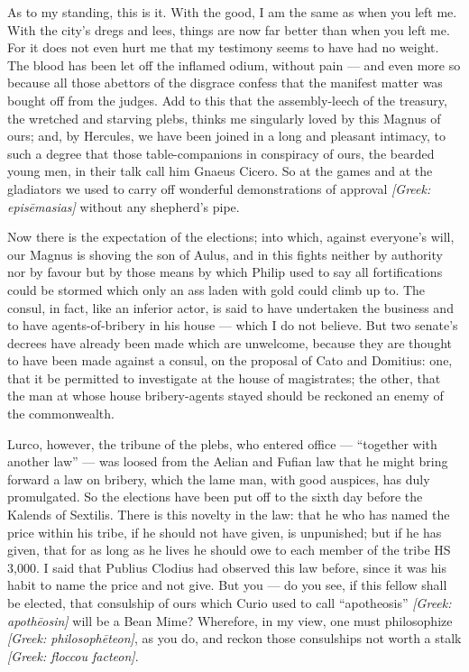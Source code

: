  As to my standing, this is it. With the good, I am the same as when you left me. With the city's dregs and lees, things are now far better than when you left me. For it does not even hurt me that my testimony seems to have had no weight. The blood has been let off the inflamed odium, without pain --- and even more so because all those abettors of the disgrace confess that the manifest matter was bought off from the judges. Add to this that the assembly-leech of the treasury, the wretched and starving plebs, thinks me singularly loved by this Magnus of ours; and, by Hercules, we have been joined in a long and pleasant intimacy, to such a degree that those table-companions in conspiracy of ours, the bearded young men, in their talk call him Gnaeus Cicero. So at the games and at the gladiators we used to carry off wonderful demonstrations of approval \textit{[Greek: epis\=emasias]} without any shepherd's pipe.

 Now there is the expectation of the elections; into which, against everyone's will, our Magnus is shoving the son of Aulus, and in this fights neither by authority nor by favour but by those means by which Philip used to say all fortifications could be stormed which only an ass laden with gold could climb up to. The consul, in fact, like an inferior actor, is said to have undertaken the business and to have agents-of-bribery in his house --- which I do not believe. But two senate's decrees have already been made which are unwelcome, because they are thought to have been made against a consul, on the proposal of Cato and Domitius: one, that it be permitted to investigate at the house of magistrates; the other, that the man at whose house bribery-agents stayed should be reckoned an enemy of the commonwealth.

 Lurco, however, the tribune of the plebs, who entered office --- ``together with another law'' --- was loosed from the Aelian and Fufian law that he might bring forward a law on bribery, which the lame man, with good auspices, has duly promulgated. So the elections have been put off to the sixth day before the Kalends of Sextilis. There is this novelty in the law: that he who has named the price within his tribe, if he should not have given, is unpunished; but if he has given, that for as long as he lives he should owe to each member of the tribe HS 3,000. I said that Publius Clodius had observed this law before, since it was his habit to name the price and not give. But you --- do you see, if this fellow shall be elected, that consulship of ours which Curio used to call ``apotheosis'' \textit{[Greek: apoth\=eosin]} will be a Bean Mime? Wherefore, in my view, one must philosophize \textit{[Greek: philosoph\=eteon]}, as you do, and reckon those consulships not worth a stalk \textit{[Greek: floccou facteon]}.

